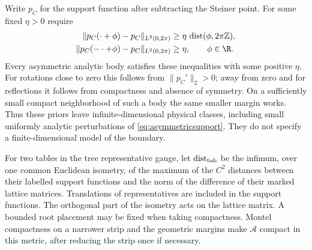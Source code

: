 Write $p_C$ for the support function after subtracting the Steiner point.
For some fixed $\eta>0$ require
\begin{align}
 \|p_C(\cdot+\phi)-p_C\|_{L^2(0,2\pi)}
   &\ge\eta\,\operatorname{dist}(\phi,2\pi\mathbb Z),
                                      \label{eq:rotationmargin}\\
 \|p_C(-\cdot+\phi)-p_C\|_{L^2(0,2\pi)}
   &\ge\eta,\qquad \phi\in\R.          \label{eq:reflectionmargin}
\end{align}
Every asymmetric analytic body satisfies these inequalities with some
positive $\eta$. For rotations close to zero this follows from
$\|p_C'\|_2>0$; away from zero and for reflections it follows from
compactness and absence of symmetry. On a sufficiently small compact
neighborhood of such a body the same smaller margin works. Thus these
priors leave infinite-dimensional physical classes, including small
uniformly analytic perturbations of \eqref{eq:asymmetricsupport}.
They do not specify a finite-dimensional model of the boundary.

For two tables in the tree representative gauge, let
$\operatorname{dist}_{\rm tab}$ be the infimum, over one common Euclidean
isometry, of the maximum of the $C^2$ distances between their labelled
support functions and the norm of the difference of their marked
lattice matrices. Translations of representatives are included in the
support functions. The orthogonal part of the isometry acts on the
lattice matrix. A bounded root placement may be fixed when taking
compactness. Montel compactness on a narrower strip and the geometric
margins make $\mathcal A$ compact in this metric, after reducing the
strip once if necessary.

